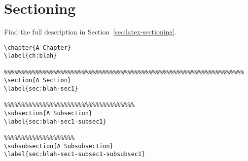 \section{Sectioning}

\begin{framed}
Find the full description in Section~\ref{sec:latex-sectioning}.
\begin{verbatim}
\chapter{A Chapter}
\label{ch:blah}

%%%%%%%%%%%%%%%%%%%%%%%%%%%%%%%%%%%%%%%%%%%%%%%%%%%%%%%%%%%%%%%%%%%%
\section{A Section}
\label{sec:blah-sec1}

%%%%%%%%%%%%%%%%%%%%%%%%%%%%%%%%%%%%%
\subsection{A Subsection}
\label{sec:blah-sec1-subsec1}

%%%%%%%%%%%%%%%%%%%%
\subsubsection{A Subsubsection}
\label{sec:blah-sec1-subsec1-subsubsec1}
\end{verbatim}
\end{framed}
